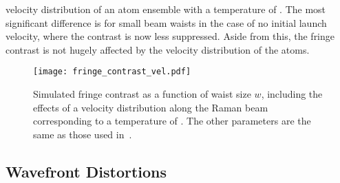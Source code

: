 velocity distribution of an atom ensemble with a
temperature of . The most significant difference is
for small beam waists in
the case of no initial launch velocity, where the contrast is now less
suppressed. Aside from this, the fringe contrast is not hugely
affected by the velocity distribution of the atoms. 
\begin{figure}[htpb]
  \centering
  \texttt{[image: fringe\_contrast\_vel.pdf]}
  \caption[Simulated fringe contrast vs beam waist size including a
  thermal velocity distribution.]{Simulated fringe contrast as a function of waist size $w$,
  including the effects of a velocity distribution along the Raman
beam corresponding to a temperature of . The other
parameters are the same as those used
in~.}
  \label{fig:phase_vel}
\end{figure}
\subsection{Wavefront Distortions}\label{subsec:fringe_wavefront}
